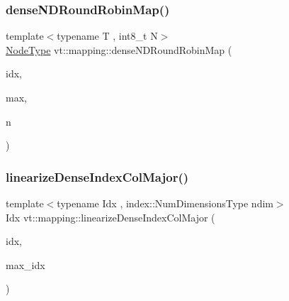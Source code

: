 \mbox{\label{namespacevt_1_1mapping_a270a829564506d7b8de50c9867ff2b76}} 
\subsubsection{\texorpdfstring{dense\+N\+D\+Round\+Robin\+Map()}{denseNDRoundRobinMap()}}
{\footnotesize\ttfamily template$<$typename T , int8\+\_\+t N$>$ \\
\hyperlink{namespacevt_a866da9d0efc19c0a1ce79e9e492f47e2}{Node\+Type} vt\+::mapping\+::dense\+N\+D\+Round\+Robin\+Map (\begin{DoxyParamCaption}\item[{\hyperlink{namespacevt_1_1mapping_ab77f5302cd346d499e48a8c796043746}{Idx\+N\+D\+Ptr}$<$ T, N $>$}]{idx,  }\item[{\hyperlink{namespacevt_1_1mapping_ab77f5302cd346d499e48a8c796043746}{Idx\+N\+D\+Ptr}$<$ T, N $>$}]{max,  }\item[{\hyperlink{namespacevt_a866da9d0efc19c0a1ce79e9e492f47e2}{Node\+Type}}]{n }\end{DoxyParamCaption})}

\mbox{\label{namespacevt_1_1mapping_a4dd58859e65edd3145fc52392161c90a}} 
\subsubsection{\texorpdfstring{linearize\+Dense\+Index\+Col\+Major()}{linearizeDenseIndexColMajor()}}
{\footnotesize\ttfamily template$<$typename Idx , index\+::\+Num\+Dimensions\+Type ndim$>$ \\
Idx vt\+::mapping\+::linearize\+Dense\+Index\+Col\+Major (\begin{DoxyParamCaption}\item[{\hyperlink{namespacevt_ac016d9c31465ce11c14eab2be11f9183}{Dense\+Index}$<$ Idx, ndim $>$ $\ast$}]{idx,  }\item[{\hyperlink{namespacevt_ac016d9c31465ce11c14eab2be11f9183}{Dense\+Index}$<$ Idx, ndim $>$ $\ast$}]{max\+\_\+idx }\end{DoxyParamCaption})}

